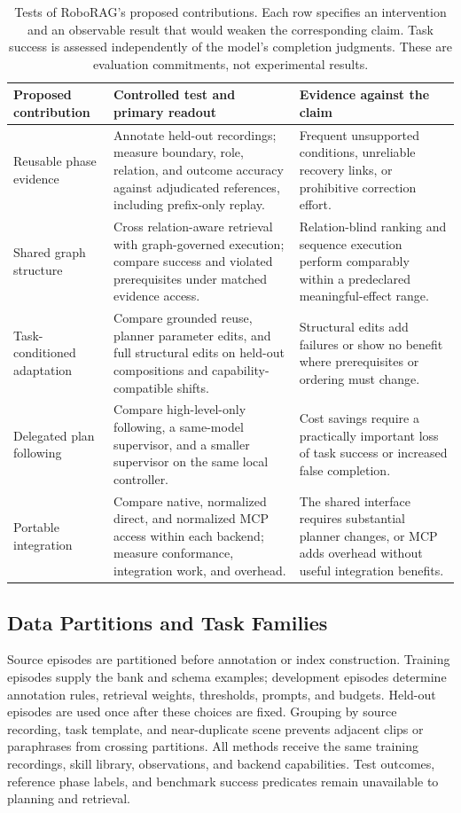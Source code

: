 \documentclass[10pt,twocolumn,letterpaper]{article}
\begin{document}
\begin{table}[t]
\centering
\small
\caption{Tests of RoboRAG's proposed contributions. Each row specifies an intervention and an observable result that would weaken the corresponding claim. Task success is assessed independently of the model's completion judgments. These are evaluation commitments, not experimental results.}
\label{tab:claim-tests}
\begin{tabularx}{\textwidth}{@{}p{}XX@{}}
\toprule
Proposed contribution & Controlled test and primary readout & Evidence against the claim \\
\midrule
Reusable phase evidence & Annotate held-out recordings; measure boundary, role, relation, and outcome accuracy against adjudicated references, including prefix-only replay. & Frequent unsupported conditions, unreliable recovery links, or prohibitive correction effort. \\
Shared graph structure & Cross relation-aware retrieval with graph-governed execution; compare success and violated prerequisites under matched evidence access. & Relation-blind ranking and sequence execution perform comparably within a predeclared meaningful-effect range. \\
Task-conditioned adaptation & Compare grounded reuse, planner parameter edits, and full structural edits on held-out compositions and capability-compatible shifts. & Structural edits add failures or show no benefit where prerequisites or ordering must change. \\
Delegated plan following & Compare high-level-only following, a same-model supervisor, and a smaller supervisor on the same local controller. & Cost savings require a practically important loss of task success or increased false completion. \\
Portable integration & Compare native, normalized direct, and normalized MCP access within each backend; measure conformance, integration work, and overhead. & The shared interface requires substantial planner changes, or MCP adds overhead without useful integration benefits. \\
\bottomrule
\end{tabularx}
\end{table}

\subsection{Data Partitions and Task Families}

Source episodes are partitioned before annotation or index construction. Training episodes supply the bank and schema examples; development episodes determine annotation rules, retrieval weights, thresholds, prompts, and budgets. Held-out episodes are used once after these choices are fixed. Grouping by source recording, task template, and near-duplicate scene prevents adjacent clips or paraphrases from crossing partitions. All methods receive the same training recordings, skill library, observations, and backend capabilities. Test outcomes, reference phase labels, and benchmark success predicates remain unavailable to planning and retrieval.
\end{document}
